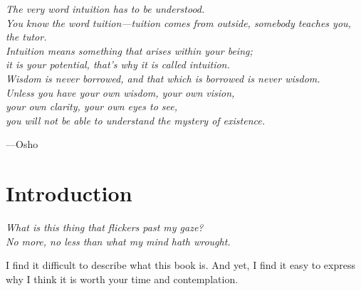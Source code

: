 \vspace*{4cm}
\begin{center}
\textit{The very word intuition has to be understood. \\[5mm]
	You know the word tuition---tuition comes from outside, somebody teaches you, the tutor. \\[5mm]
	Intuition means something that arises within your being; \\[5mm]
	it is your potential, that’s why it is called intuition. \\[5mm]
	Wisdom is never borrowed, and that which is borrowed is never wisdom. \\[5mm]
	Unless you have your own wisdom, your own vision, \\[5mm]
	your own clarity, your own eyes to see, \\[5mm]
	you will not be able to understand the mystery of existence.}
\begin{flushright}
	---Osho
\end{flushright}
\end{center}

\newpage



\part*{Introduction}


\begin{displayquote}
\textit{What is this thing that flickers past my gaze? \\
	No more, no less than what my mind hath wrought.}
\vspace{4mm}
\end{displayquote}

I find it difficult to describe what this book is. And yet, I find it easy to express why I think it is worth your time and contemplation.

